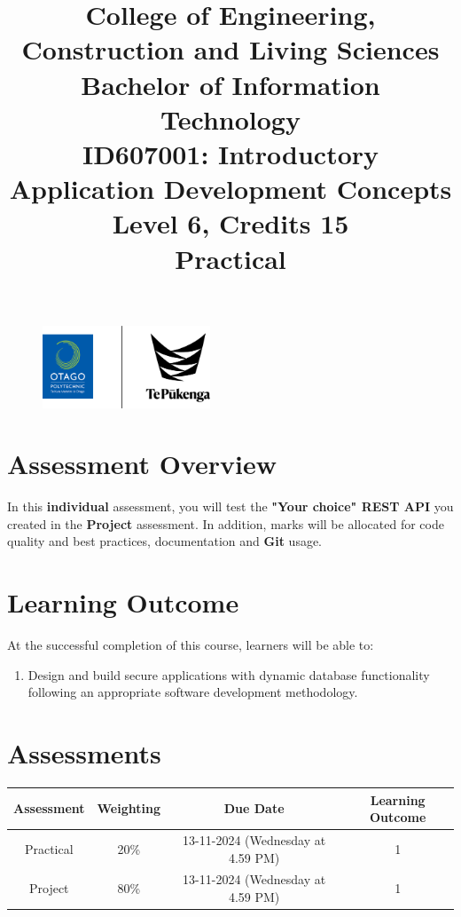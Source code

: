 \documentclass{article}
\author{}
\begin{document}
\begin{figure}
    \centering
    \includegraphics[width=50mm]{../img/logo.png}
\end{figure}

\title{College of Engineering, Construction and Living Sciences\\Bachelor of Information Technology\\ID607001: Introductory Application Development Concepts\\Level 6, Credits 15\\\textbf{Practical}}
\date{}
\maketitle

\section*{Assessment Overview}
In this \textbf{individual} assessment, you will test the \textbf{"Your choice" REST API} you created in the \textbf{Project} assessment. In addition, marks will be allocated for code quality and best practices, documentation and \textbf{Git} usage.  

\section*{Learning Outcome}
At the successful completion of this course, learners will be able to:
\begin{enumerate}
	\item Design and build secure applications with dynamic database functionality following an appropriate software development methodology.
\end{enumerate}

\section*{Assessments}
\renewcommand{\arraystretch}{1.5}
\begin{tabular}{|c|c|c|c|}
	\hline
	\textbf{Assessment}                                 & \textbf{Weighting} & \textbf{Due Date}            & \textbf{Learning Outcome} \\ \hline
	\small Practical & \small 20\%        & \small 13-11-2024 (Wednesday at 4.59 PM)   & \small 1                   \\ \hline
	\small Project                 & \small 80\%        & \small 13-11-2024 (Wednesday at 4.59 PM) \small  & \small 1                   \\ \hline
\end{tabular}
\end{document}
